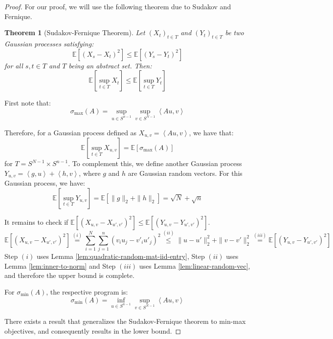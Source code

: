 \documentclass{article}
\newtheorem{theorem}{Theorem}[subsection]
\theoremstyle{remark}
\newcommand{\Exp}{\mathbb{E}}
\newcommand{\inner}[2]{\left\langle #1, #2 \right\rangle}
\begin{document}
\begin{proof}
For our proof, we will use the following theorem due to Sudakov and Fernique.
\begin{theorem}[Sudakov-Fernique Theorem]
Let \((X_{t})_{t \in T}\) and \((Y_{t})_{t \in T}\) be two Gaussian processes satisfying:
\begin{equation*}
\Exp\left[(X_{s} - X_{t})^{2}\right] \leq \Exp\left[(Y_{s} - Y_{t})^{2}\right]
\end{equation*}
for all \(s, t \in T\) and \(T\) being an abstract set. Then:
\begin{equation*}
\Exp\left[\sup_{t \in T} X_{t}\right] \leq \Exp\left[\sup_{t \in T}Y_{t}\right]
\end{equation*}
\end{theorem}

First note that:
\begin{equation*}
\sigma_{\max}(A) = \sup_{u \in S^{n-1}} \sup_{v \in S^{N - 1}} \inner{Au}{v}
\end{equation*}

Therefore, for a Gaussian process defined as \(X_{u, v} = \inner{Au}{v}\), we have that:
\begin{equation*}
\Exp\left[\sup_{t \in T}X_{u, v}\right] = \Exp[\sigma_{\max}(A)]
\end{equation*}
for \(T = S^{N-1} \times S^{n-1}\). To complement this, we define another Gaussian process \(Y_{u, v} = \inner{g}{u} + \inner{h}{v}\), where \(g\) and \(h\) are Gaussian random vectors. For this Gaussian process, we have:
\begin{equation*}
\Exp\left[\sup_{t \in T} Y_{u, v}\right] = \Exp\left[\|g\|_{2} + \|h\|_{2}\right] = \sqrt{N} + \sqrt{n}
\end{equation*}

It remains to check if \(\Exp\left[(X_{u, v} - X_{u',v'})^{2}\right] \leq \Exp\left[(Y_{u, v} - Y_{u', v'})^{2}\right]\).
\begin{equation*}
\Exp\left[(X_{u, v} - X_{u', v'})^{2}\right] \overset{(i)}= \sum_{i=1}^{N}\sum_{j=1}^{n}(v_{i}u_{j} - v'_{i}u'_{j})^{2} \overset{(ii)}\leq \|u - u'\|_{2}^{2} + \|v - v'\|_{2}^{2} \overset{(iii)}= \Exp\left[(Y_{u, v} - Y_{u', v'})^{2}\right]
\end{equation*}
Step \((i)\) uses Lemma \ref{lem:quadratic-random-mat-iid-entry}, Step \((ii)\) uses Lemma \ref{lem:inner-to-norm} and Step \((iii)\) uses Lemma \ref{lem:linear-random-vec}, and therefore the upper bound is complete.

For \(\sigma_{\min}(A)\), the respective program is:
\begin{equation*}
\sigma_{\min}(A) = \inf_{u \in S^{n-1}} \sup_{v \in S^{N - 1}} \inner{Au}{v}
\end{equation*}

There exists a result that generalizes the Sudakov-Fernique theorem to min-max objectives, and consequently results in the lower bound.
\end{proof}
\end{document}
